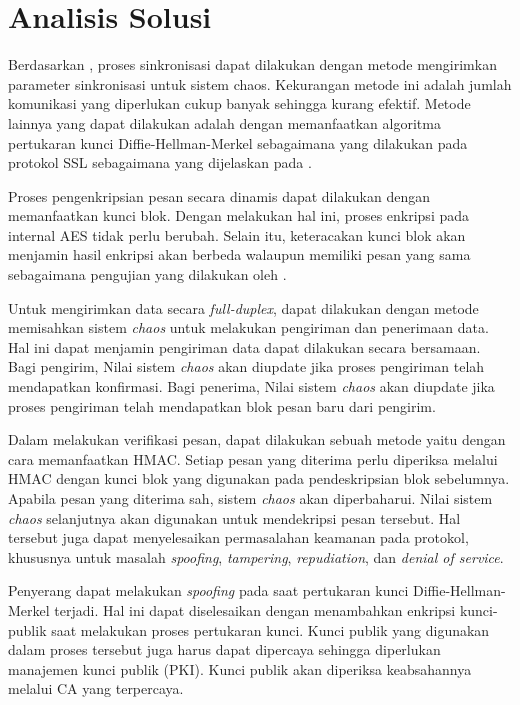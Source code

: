 \section{Analisis Solusi} 

Berdasarkan \textcite{lin2021}, proses sinkronisasi dapat dilakukan dengan metode mengirimkan parameter sinkronisasi untuk sistem chaos. Kekurangan metode ini adalah jumlah komunikasi yang diperlukan cukup banyak sehingga kurang efektif. Metode lainnya yang dapat dilakukan adalah dengan memanfaatkan algoritma pertukaran kunci Diffie-Hellman-Merkel sebagaimana yang dilakukan pada protokol SSL sebagaimana yang dijelaskan pada \textcite{munir2019}.

Proses pengenkripsian pesan secara dinamis dapat dilakukan dengan memanfaatkan kunci blok. Dengan melakukan hal ini, proses enkripsi pada internal AES tidak perlu berubah. Selain itu, keteracakan kunci blok akan menjamin hasil enkripsi akan berbeda walaupun memiliki pesan yang sama sebagaimana pengujian yang dilakukan oleh \textcite{lin2021}.

Untuk mengirimkan data secara \emph{full-duplex}, dapat dilakukan dengan metode memisahkan sistem \emph{chaos} untuk melakukan pengiriman dan penerimaan data. Hal ini dapat menjamin pengiriman data dapat dilakukan secara bersamaan. Bagi pengirim, Nilai sistem \emph{chaos} akan diupdate jika proses pengiriman telah mendapatkan konfirmasi. Bagi penerima, Nilai sistem \emph{chaos} akan diupdate jika proses pengiriman telah mendapatkan blok pesan baru dari pengirim.

Dalam melakukan verifikasi pesan, dapat dilakukan sebuah metode yaitu dengan cara memanfaatkan HMAC. Setiap pesan yang diterima perlu diperiksa melalui HMAC dengan kunci blok yang digunakan pada pendeskripsian blok sebelumnya. Apabila pesan yang diterima sah, sistem \emph{chaos} akan diperbaharui. Nilai sistem \emph{chaos} selanjutnya akan digunakan untuk mendekripsi pesan tersebut. Hal tersebut juga dapat menyelesaikan permasalahan keamanan pada protokol, khususnya untuk masalah \emph{spoofing}, \emph{tampering}, \emph{repudiation}, dan \emph{denial of service}.

Penyerang dapat melakukan \emph{spoofing} pada saat pertukaran kunci Diffie-Hellman-Merkel terjadi. Hal ini dapat diselesaikan dengan menambahkan enkripsi kunci-publik saat melakukan proses pertukaran kunci. Kunci publik yang digunakan dalam proses tersebut juga harus dapat dipercaya sehingga diperlukan manajemen kunci publik (PKI). Kunci publik akan diperiksa keabsahannya melalui CA yang terpercaya.

